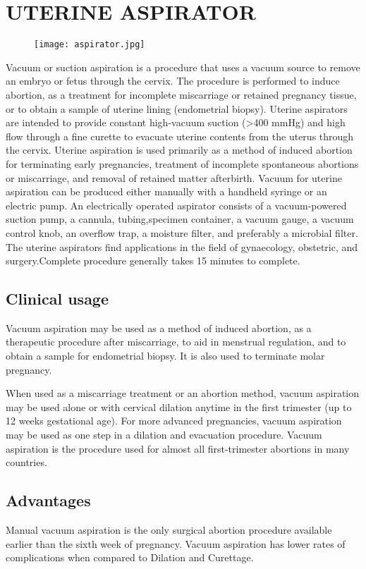 \documentclass[12pt]{article}
\begin{document}
\section{UTERINE ASPIRATOR}
\begin{figure}
\centering
\texttt{[image: aspirator.jpg]}
\end{figure}
Vacuum or suction aspiration is a procedure that uses a vacuum source to remove an embryo or fetus through the cervix. The procedure is performed to induce abortion, as a treatment for incomplete miscarriage or retained pregnancy tissue, or to obtain a sample of uterine lining (endometrial biopsy). Uterine aspirators are intended to provide constant high-vacuum suction (>400 mmHg) and high flow through a fine curette to evacuate uterine contents from the uterus through the cervix. Uterine aspiration is used primarily as a method of induced abortion for terminating early pregnancies, treatment of incomplete spontaneous abortions or miscarriage, and removal of retained matter afterbirth. Vacuum for uterine aspiration can be produced either manually with a handheld syringe or an electric pump. An electrically operated aspirator consists of a vacuum-powered suction pump, a cannula, tubing,specimen container, a vacuum gauge, a vacuum control knob, an overflow trap, a moisture filter, and preferably a microbial filter. The uterine aspirators find applications in the field of gynaecology, obstetric, and surgery.Complete procedure generally takes 15 minutes to complete.
 \subsection{Clinical usage}
 Vacuum aspiration may be used as a method of induced abortion, as a therapeutic procedure after miscarriage, to aid in menstrual regulation, and to obtain a sample for endometrial biopsy. It is also used to terminate molar pregnancy.

When used as a miscarriage treatment or an abortion method, vacuum aspiration may be used alone or with cervical dilation anytime in the first trimester (up to 12 weeks gestational age). For more advanced pregnancies, vacuum aspiration may be used as one step in a dilation and evacuation procedure. Vacuum aspiration is the procedure used for almost all first-trimester abortions in many countries.

 \subsection{Advantages} Manual vacuum aspiration is the only surgical abortion procedure available earlier than the sixth week of pregnancy. Vacuum aspiration has lower rates of complications when compared to Dilation and Curettage.
\end{document}
